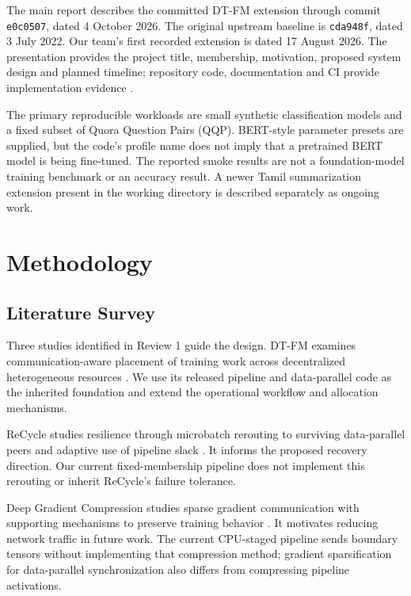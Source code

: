 The main report describes the committed DT-FM extension through commit \texttt{e0c0507}, dated 4 October 2026. The original upstream baseline is \texttt{cda948f}, dated 3 July 2022. Our team's first recorded extension is dated 17 August 2026. The presentation provides the project title, membership, motivation, proposed system design and planned timeline; repository code, documentation and CI provide implementation evidence \cite{upstream,fork,ci}.

The primary reproducible workloads are small synthetic classification models and a fixed subset of Quora Question Pairs (QQP). BERT-style parameter presets are supplied, but the code's profile name does not imply that a pretrained BERT model is being fine-tuned. The reported smoke results are not a foundation-model training benchmark or an accuracy result. A newer Tamil summarization extension present in the working directory is described separately as ongoing work.

\section{Methodology}

\subsection{Literature Survey}

Three studies identified in Review 1 guide the design. DT-FM examines communication-aware placement of training work across decentralized heterogeneous resources \cite{dtfm}. We use its released pipeline and data-parallel code as the inherited foundation and extend the operational workflow and allocation mechanisms.

ReCycle studies resilience through microbatch rerouting to surviving data-parallel peers and adaptive use of pipeline slack \cite{recycle}. It informs the proposed recovery direction. Our current fixed-membership pipeline does not implement this rerouting or inherit ReCycle's failure tolerance.

Deep Gradient Compression studies sparse gradient communication with supporting mechanisms to preserve training behavior \cite{dgc}. It motivates reducing network traffic in future work. The current CPU-staged pipeline sends boundary tensors without implementing that compression method; gradient sparsification for data-parallel synchronization also differs from compressing pipeline activations.

